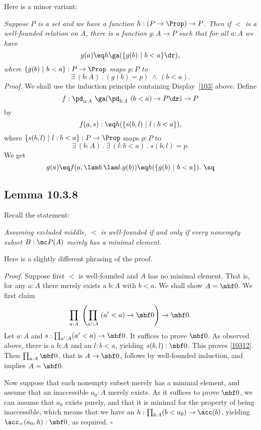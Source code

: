 \documentclass[12pt]{article}
\begin{document}
Here is a minor variant:

\nn\emph{Suppose $P$ is a set and we have a function $h:(P\to\Prop)\to P$. Then if $<$ is a well-founded relation on $A$, there is a function $g:A\to P$ such that for all $a:A$ we have} 
$$
g(a)\eq h\ga(\{g(b)\ \vert\ b<a\}\dr),
$$ 
\emph{where $\{g(b)\ \vert\ b<a\}:P\to\Prop$ maps $p:P$ to} 
$$
\exists\ (b:A)\ .\ (g(b)=p)\ \wedge\ (b<a).
$$ 
\emph{Proof.} We shall use the induction principle containing Display~\eqref{103} above. Define 
$$
f:\pd_{a:A}\ \ga(\pd_{b:A}\ (b<a)\to P\dr)\to P
$$ 
by 
$$
f(a,s):\eq h(\{s(b,l)\ \vert\ l:b<a\}),
$$ 
where $\{s(b,l)\ \vert\ l:b<a\}:P\to\Prop$ maps $p:P$ to 
$$
\exists\ (b:A)\ .\ \exists\ (l:b<a)\ .\ s(b,l)=p.
$$ 
We get 
$$
g(a)\eq f(a,\lam b.\lam l.g(b))\eq h(\{g(b)\ \vert\ b<a\}).\ \sq
$$ 


\subsection{Lemma 10.3.8}

Recall the statement: 

\nn\emph{Assuming excluded middle, $<$ is well-founded if and only if every nonempty subset $B:\mc P(A)$ merely has a minimal element.} 

Here is a slightly different phrasing of the proof.

\nn\emph{Proof.} Suppose first $<$ is well-founded and $A$ has no minimal element. That is, for any $a:A$ there merely exists a $b:A$ with $b<a$. We shall show $A=\mbf0$. We first claim 
\begin{equation}\label{10312}
\prod_{a:A}\ \left(\prod_{a':A}\ (a'<a)\to\mbf0\right)\to\mbf0.
\end{equation}
Let $a:A$ and $s:\prod_{a':A}(a'<a)\to\mbf0$. It suffices to prove $\mbf0$. As observed above, there is a $b:A$ and an $l:b<a$, yielding $s(b,l):\mbf0$. This proves \eqref{10312}. Then $\prod_{a:A}\mbf0$, that is $A\to\mbf0$, follows by well-founded induction, and implies $A=\mbf0$. 

Now suppose that each nonempty subset merely has a minimal element, and assume that an inaccessible $a_0:A$ merely exists. As it suffices to prove $\mbf0$, we can assume that $a_0$ exists purely, and that it is minimal for the property of being inaccessible, which means that we have an $h:\prod_{b:A}(b<a_0)\to\acc(b)$, yielding $\acc_<(a_0,h):\mbf0$, as required. $\square$

\end{document}
